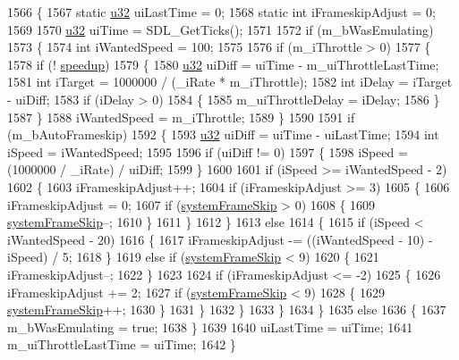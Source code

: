 \begin{DoxyCode}
1566 \{
1567   \textcolor{keyword}{static} \mbox{\hyperlink{_system_8h_a10e94b422ef0c20dcdec20d31a1f5049}{u32}} uiLastTime = 0;
1568   \textcolor{keyword}{static} \textcolor{keywordtype}{int} iFrameskipAdjust = 0;
1569 
1570   \mbox{\hyperlink{_system_8h_a10e94b422ef0c20dcdec20d31a1f5049}{u32}} uiTime = SDL\_GetTicks();
1571 
1572   \textcolor{keywordflow}{if} (m\_bWasEmulating)
1573   \{
1574     \textcolor{keywordtype}{int} iWantedSpeed = 100;
1575 
1576     \textcolor{keywordflow}{if} (m\_iThrottle > 0)
1577     \{
1578       \textcolor{keywordflow}{if} (! \mbox{\hyperlink{_g_b_8cpp_a20b0a3180ffba5989d1414a438ea11dc}{speedup}})
1579       \{
1580         \mbox{\hyperlink{_system_8h_a10e94b422ef0c20dcdec20d31a1f5049}{u32}} uiDiff  = uiTime - m\_uiThrottleLastTime;
1581         \textcolor{keywordtype}{int} iTarget = 1000000 / (\_iRate * m\_iThrottle);
1582         \textcolor{keywordtype}{int} iDelay  = iTarget - uiDiff;
1583         \textcolor{keywordflow}{if} (iDelay > 0)
1584         \{
1585           m\_uiThrottleDelay = iDelay;
1586         \}
1587       \}
1588       iWantedSpeed = m\_iThrottle;
1589     \}
1590 
1591     \textcolor{keywordflow}{if} (m\_bAutoFrameskip)
1592     \{
1593       \mbox{\hyperlink{_system_8h_a10e94b422ef0c20dcdec20d31a1f5049}{u32}} uiDiff = uiTime - uiLastTime;
1594       \textcolor{keywordtype}{int} iSpeed = iWantedSpeed;
1595 
1596       \textcolor{keywordflow}{if} (uiDiff != 0)
1597       \{
1598         iSpeed = (1000000 / \_iRate) / uiDiff;
1599       \}
1600 
1601       \textcolor{keywordflow}{if} (iSpeed >= iWantedSpeed - 2)
1602       \{
1603         iFrameskipAdjust++;
1604         \textcolor{keywordflow}{if} (iFrameskipAdjust >= 3)
1605         \{
1606           iFrameskipAdjust = 0;
1607           \textcolor{keywordflow}{if} (\mbox{\hyperlink{system_8cpp_ac88aa402d015fda6917b150c22a28968}{systemFrameSkip}} > 0)
1608           \{
1609             \mbox{\hyperlink{system_8cpp_ac88aa402d015fda6917b150c22a28968}{systemFrameSkip}}--;
1610           \}
1611         \}
1612       \}
1613       \textcolor{keywordflow}{else}
1614       \{
1615         \textcolor{keywordflow}{if} (iSpeed < iWantedSpeed - 20)
1616         \{
1617           iFrameskipAdjust -= ((iWantedSpeed - 10) - iSpeed) / 5;
1618         \}
1619         \textcolor{keywordflow}{else} \textcolor{keywordflow}{if} (\mbox{\hyperlink{system_8cpp_ac88aa402d015fda6917b150c22a28968}{systemFrameSkip}} < 9)
1620         \{
1621           iFrameskipAdjust--;
1622         \}
1623 
1624         \textcolor{keywordflow}{if} (iFrameskipAdjust <= -2)
1625         \{
1626           iFrameskipAdjust += 2;
1627           \textcolor{keywordflow}{if} (\mbox{\hyperlink{system_8cpp_ac88aa402d015fda6917b150c22a28968}{systemFrameSkip}} < 9)
1628           \{
1629             \mbox{\hyperlink{system_8cpp_ac88aa402d015fda6917b150c22a28968}{systemFrameSkip}}++;
1630           \}
1631         \}
1632       \}
1633     \}
1634   \}
1635   \textcolor{keywordflow}{else}
1636   \{
1637     m\_bWasEmulating = \textcolor{keyword}{true};
1638   \}
1639 
1640   uiLastTime = uiTime;
1641   m\_uiThrottleLastTime = uiTime;
1642 \}
\end{DoxyCode}
